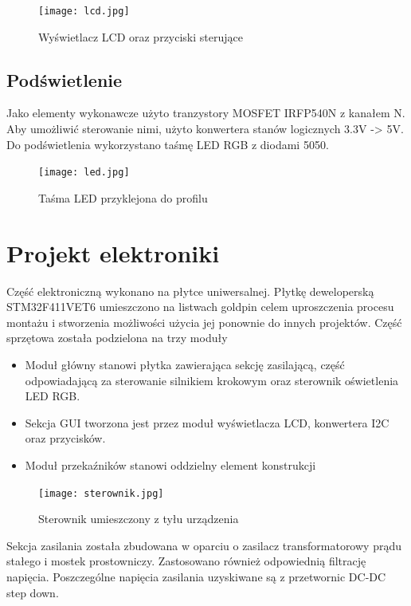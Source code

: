 \documentclass[10pt, a4paper]{article}
\begin{document}
\begin{figure}[H]
	\centering
	\texttt{[image: lcd.jpg]}
	\caption{Wyświetlacz LCD oraz przyciski sterujące}
	\label{fig:LCD}
\end{figure}

\subsection{Podświetlenie}
Jako elementy wykonawcze użyto tranzystory MOSFET IRFP540N z kanałem N. Aby umożliwić sterowanie nimi, użyto konwertera stanów logicznych 3.3V -> 5V. Do podświetlenia wykorzystano taśmę LED RGB z diodami 5050.

\begin{figure}[H]
	\centering
	\texttt{[image: led.jpg]}
	\caption{Taśma LED przyklejona do profilu}
	\label{fig:LED}
\end{figure}
\newpage
\section{Projekt elektroniki}


Część elektroniczną wykonano na płytce uniwersalnej. Płytkę deweloperską STM32F411VET6 umieszczono na listwach goldpin celem uproszczenia procesu montażu i stworzenia możliwości użycia jej ponownie do innych projektów. 
Część sprzętowa została podzielona na trzy moduły
\begin{itemize}
    \item  Moduł główny stanowi płytka zawierająca sekcję zasilającą, część odpowiadającą za sterowanie silnikiem krokowym oraz sterownik oświetlenia LED RGB. 
    
    \item Sekcja GUI tworzona jest przez moduł wyświetlacza LCD, konwertera I2C oraz przycisków.
    
    \item Moduł przekaźników stanowi oddzielny element konstrukcji
\end{itemize}


\begin{figure}[H]
	\centering
	\texttt{[image: sterownik.jpg]}
	\caption{Sterownik umieszczony z tyłu urządzenia}
	\label{fig:Sterownik}
\end{figure}

Sekcja zasilania została zbudowana w oparciu o zasilacz transformatorowy prądu stałego i mostek prostowniczy. Zastosowano również odpowiednią filtrację napięcia. Poszczególne napięcia zasilania uzyskiwane są z przetwornic DC-DC step down.
\end{document}

